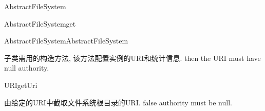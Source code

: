 \begin{XeClass}{AbstractFileSystem}
\begin{XeMethod}{}{AbstractFileSystem}{get}
    \end{XeMethod}

    \begin{XeMethod}{\XeProtected}{AbstractFileSystem}{AbstractFileSystem}
         
 子类需用的构造方法, 该方法配置实例的URI和统计信息.
 then the URI must have null authority.

    \end{XeMethod}

    \begin{XeMethod}{\XePrivate}{URI}{getUri}
         
 由给定的URI中截取文件系统根目录的URI.
 false authority must be null.

    \end{XeMethod}

\end{XeClass}
